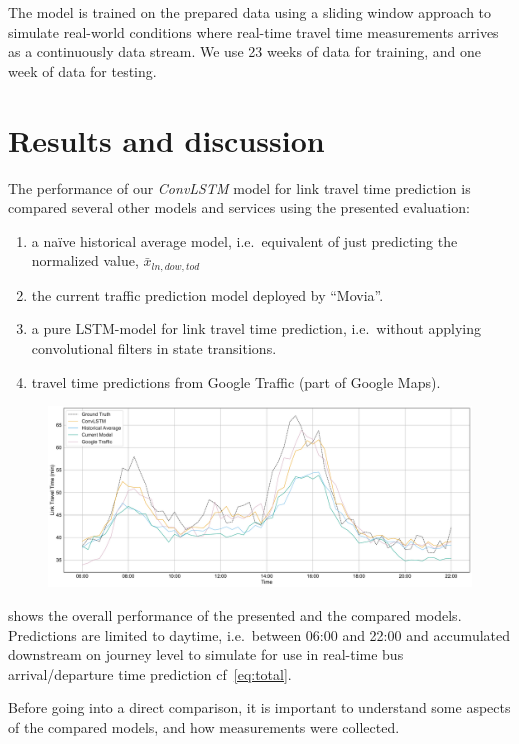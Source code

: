 \documentclass[preprint,11pt,5p,twocolumn]{elsarticle}
\begin{document}
The model is trained on the prepared data using a sliding window approach to simulate real-world conditions where real-time travel time measurements arrives as a continuously data stream. We use 23 weeks of data for training, and one week of data for testing.

\section{Results and discussion}
\label{sec:results}
The performance of our \emph{ConvLSTM} model for link travel time prediction is compared several other models and services using the presented evaluation:
\begin{enumerate}
   \item a naïve historical average model, i.e.\ equivalent of just predicting the normalized value, $\bar{x}_{\mathit{ln},\mathit{dow},\mathit{tod}}$ 
   \item the current traffic prediction model deployed by ``Movia''.
   \item a pure LSTM-model for link travel time prediction, i.e.\ without applying convolutional filters in state transitions.
   \item travel time predictions from Google Traffic (part of Google Maps).
\end{enumerate}

\begin{figure}[!t]
  \centering
  \includegraphics[width=\textwidth]{plots/comparison_day.pdf}
  \caption{}
  \label{fig:comparison_day}
\end{figure}

 shows the overall performance of the presented and the compared models. Predictions are limited to daytime, i.e.\ between 06:00 and 22:00 and accumulated downstream on journey level to simulate for use in real-time bus arrival/departure time prediction cf~\cref{eq:total}. 

Before going into a direct comparison, it is important to understand some aspects of the compared models, and how measurements were collected.
\end{document}

